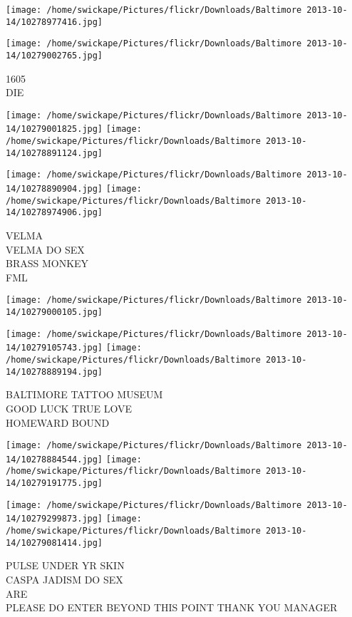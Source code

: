 \documentclass[10pt,letterpaper]{article}
\begin{document}
\texttt{[image: /home/swickape/Pictures/flickr/Downloads/Baltimore 2013-10-14/10278977416.jpg]}

\vspace{0.25in}
\texttt{[image: /home/swickape/Pictures/flickr/Downloads/Baltimore 2013-10-14/10279002765.jpg]}

1605\\
DIE
\pagebreak

\texttt{[image: /home/swickape/Pictures/flickr/Downloads/Baltimore 2013-10-14/10279001825.jpg]}
\texttt{[image: /home/swickape/Pictures/flickr/Downloads/Baltimore 2013-10-14/10278891124.jpg]}

\texttt{[image: /home/swickape/Pictures/flickr/Downloads/Baltimore 2013-10-14/10278890904.jpg]}
\texttt{[image: /home/swickape/Pictures/flickr/Downloads/Baltimore 2013-10-14/10278974906.jpg]}

VELMA\\
VELMA DO SEX\\
BRASS MONKEY\\
FML
\pagebreak

\texttt{[image: /home/swickape/Pictures/flickr/Downloads/Baltimore 2013-10-14/10279000105.jpg]}

\vspace{0.25in}
\texttt{[image: /home/swickape/Pictures/flickr/Downloads/Baltimore 2013-10-14/10279105743.jpg]}
\texttt{[image: /home/swickape/Pictures/flickr/Downloads/Baltimore 2013-10-14/10278889194.jpg]}

BALTIMORE TATTOO MUSEUM\\
GOOD LUCK TRUE LOVE\\
HOMEWARD BOUND
\pagebreak

\texttt{[image: /home/swickape/Pictures/flickr/Downloads/Baltimore 2013-10-14/10278884544.jpg]}
\texttt{[image: /home/swickape/Pictures/flickr/Downloads/Baltimore 2013-10-14/10279191775.jpg]}

\texttt{[image: /home/swickape/Pictures/flickr/Downloads/Baltimore 2013-10-14/10279299873.jpg]}
\texttt{[image: /home/swickape/Pictures/flickr/Downloads/Baltimore 2013-10-14/10279081414.jpg]}

PULSE UNDER YR SKIN\\
CASPA JADISM DO SEX\\
ARE\\
PLEASE DO ENTER BEYOND THIS POINT THANK YOU MANAGER
\pagebreak
\end{document}
